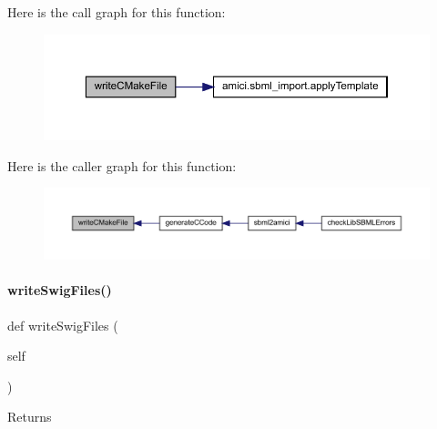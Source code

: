 Here is the call graph for this function\+:
\nopagebreak
\begin{figure}[H]
\begin{center}
\leavevmode
\includegraphics[width=350pt]{classamici_1_1sbml__import_1_1_sbml_importer_ada11f0c35bdbd4d23c25f438df36f954_cgraph}
\end{center}
\end{figure}
Here is the caller graph for this function\+:
\nopagebreak
\begin{figure}[H]
\begin{center}
\leavevmode
\includegraphics[width=350pt]{classamici_1_1sbml__import_1_1_sbml_importer_ada11f0c35bdbd4d23c25f438df36f954_icgraph}
\end{center}
\end{figure}
\mbox{\label{classamici_1_1sbml__import_1_1_sbml_importer_a3d8fd08075f483671515fcfae70e1c29}} 
\paragraph{\texorpdfstring{write\+Swig\+Files()}{writeSwigFiles()}}
{\footnotesize\ttfamily def write\+Swig\+Files (\begin{DoxyParamCaption}\item[{}]{self }\end{DoxyParamCaption})}

\begin{DoxyReturn}{Returns}

\end{DoxyReturn}


